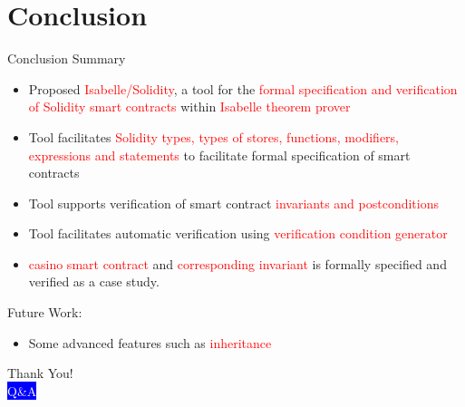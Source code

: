 \documentclass[aspectratio=169]{beamer}
\begin{document}
\section{Conclusion}
\frame{\tableofcontents[currentsection]}

\begin{frame}{Conclusion}
Summary
\begin{itemize}
	\item Proposed \textcolor{red}{Isabelle/Solidity}, a tool for the \textcolor{red}{formal specification and verification
	of Solidity smart contracts} within \textcolor{red}{Isabelle theorem prover}
	\item Tool facilitates \textcolor{red}{Solidity types, types of stores, functions, modifiers, expressions and statements} to facilitate formal specification of smart contracts
	\item Tool supports verification of smart contract \textcolor{red}{invariants and postconditions}
		\item Tool facilitates automatic  verification using \textcolor{red}{verification condition generator}
	\item  \textcolor{red}{casino smart contract} and \textcolor{red}{corresponding invariant} is formally specified and verified as a case study.

\end{itemize}
\bigskip

Future Work: 
\begin{itemize}
	\item Some advanced features such as \textcolor{red}{inheritance}
\end{itemize}
\end{frame}
\begin{frame}{}
	\begin{center}
{\fontsize{40}{50}\selectfont Thank You!}\\
\vspace{0.5in}
{\fontsize{30}{40}\selectfont \textcolor{white}{\colorbox{blue}{Q\&A}}}\\
\end{center}
\end{frame}
%
\end{document}
